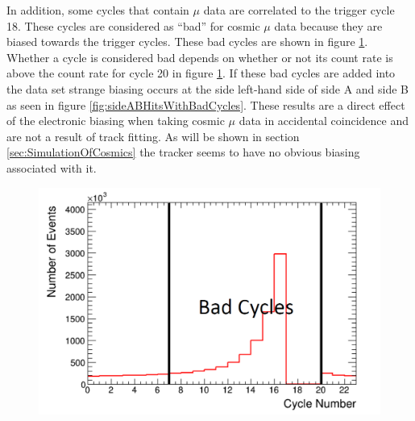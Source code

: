 In addition, some cycles that contain $\mu$ data are correlated to the trigger cycle 18. These cycles are considered as ``bad'' for cosmic $\mu$ data because they are biased towards the trigger cycles. These bad cycles are shown in figure \ref{fig:badCycles}. Whether a cycle is considered bad depends on whether or not its count rate is above the count rate for cycle 20 in figure \ref{fig:badCycles}. If these bad cycles are added into the data set strange biasing occurs at the side left-hand side of side A and side B as seen in figure \ref{fig:sideABHitsWithBadCycles}. These results are a direct effect of the electronic biasing when taking cosmic $\mu$ data in accidental coincidence and are not a result of track fitting. As will be shown in section \ref{sec:SimulationOfCosmics} the tracker seems to have no obvious biasing associated with it. %

\begin{figure}[htbp]
 \centering
 \includegraphics[width=0.7\linewidth]{Chapter5/Figs/Raster/badCycles.png}
 \label{fig:badCycles}
\end{figure}

